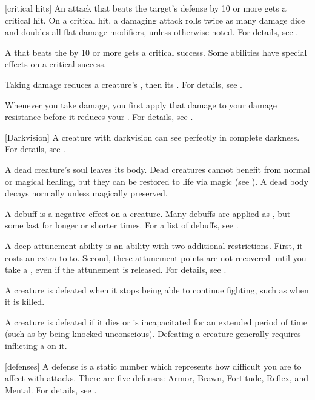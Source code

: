 [critical hits] An attack that beats the target's defense by 10 or more gets a critical hit.
On a critical hit, a damaging attack rolls twice as many damage dice and doubles all flat damage modifiers, unless otherwise noted.
For details, see .

 A  that beats the  by 10 or more gets a critical success.
Some abilities have special effects on a critical success.

 Taking damage reduces a creature's , then its .
For details, see .

 Whenever you take damage, you first apply that damage to your damage resistance before it reduces your .
For details, see .

[Darkvision] A creature with darkvision can see perfectly in complete darkness.
For details, see .

 A dead creature's soul leaves its body. Dead creatures cannot benefit from normal or magical healing, but they can be restored to life via magic (see ). A dead body decays normally unless magically preserved.

 A debuff is a negative effect on a creature.
Many debuffs are applied as , but some last for longer or shorter times.
For a list of debuffs, see .

 A deep attunement ability is an  ability with two additional restrictions.
First, it costs an extra  to  to.
Second, these attunement points are not recovered until you take a , even if the attunement is released.
For details, see .

 A creature is defeated when it stops being able to continue fighting, such as when it is killed.

 A creature is defeated if it dies or is incapacitated for an extended period of time (such as by being knocked unconscious).
Defeating a creature generally requires inflicting a  on it.

[defenses] A defense is a static number which represents how difficult you are to affect with attacks.
There are five defenses: Armor, Brawn, Fortitude, Reflex, and Mental.
For details, see .

